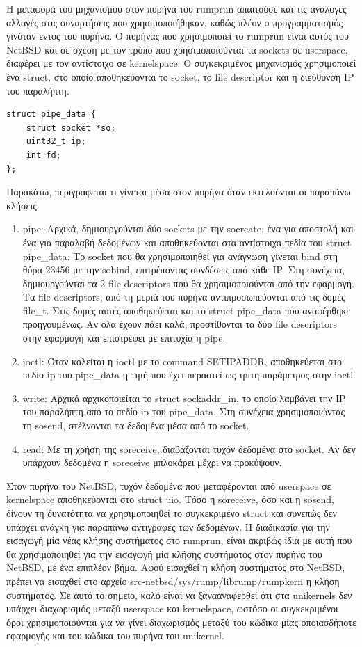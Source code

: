 Η μεταφορά του μηχανισμού στον πυρήνα του rumprun απαιτούσε και τις ανάλογες
αλλαγές στις συναρτήσεις που χρησιμοποιήθηκαν, καθώς πλέον ο προγραμματισμός
γινόταν εντός του πυρήνα. Ο πυρήνας που χρησιμοποιεί το rumprun είναι αυτός του
NetBSD και σε σχέση με τον τρόπο που χρησιμοποιούνται τα sockets σε userspace,
διαφέρει με τον αντίστοιχο σε kernelspace. Ο συγκεκριμένος μηχανισμός
χρησιμοποιεί ένα struct, στο οποίο αποθηκεύονται το socket, το file descriptor
και η διεύθυνση IP του παραλήπτη. 
\begin{lstlisting}[numbers=none,  xleftmargin=.2\textwidth, xrightmargin=.2\textwidth]
struct pipe_data {
	struct socket *so;
	uint32_t ip;
	int fd;
};
\end{lstlisting}
Παρακάτω, περιγράφεται τι γίνεται μέσα στον πυρήνα όταν εκτελούνται οι παραπάνω
κλήσεις. 
\begin{enumerate}
	\item pipe: Αρχικά, δημιουργούνται δύο sockets με την socreate, ένα για
		αποστολή και ένα για παραλαβή δεδομένων και αποθηκεύονται στα
		αντίστοιχα πεδία του struct pipe\_data. Το socket που θα
		χρησιμοποιηθεί για ανάγνωση γίνεται bind στη θύρα 23456 με την
		sobind,	επιτρέποντας συνδέσεις από κάθε IP. Στη συνέχεια,
		δημιουργούνται τα 2 file descriptors που θα χρησιμοποιούνται από
		την εφαρμογή. Τα file descriptors, από τη μεριά του πυρήνα
		αντιπροσωπεύονται από τις δομές file\_t. Στις δομές
		αυτές αποθηκεύεται και το struct pipe\_data που αναφέρθηκε
		προηγουμένως. Αν όλα έχουν πάει καλά, προστίθονται τα δύο file
		descriptors στην εφαρμογή και επιστρέφει με επιτυχία η pipe.
	\item ioctl: Όταν καλείται η ioctl με το command SETIPADDR, αποθηκεύεται
		στο πεδίο ip του pipe\_data η τιμή που έχει περαστεί ως τρίτη
		παράμετρος στην ioctl.
	\item write: Αρχικά αρχικοποιείται το struct sockaddr\_in, το οποίο
		λαμβάνει την IP του παραλήπτη από το πεδίο ip του pipe\_data.
		Στη συνέχεια χρησιμοποιώντας τη sosend, στέλνονται τα δεδομένα
		μέσα από το socket.
	\item read: Με τη χρήση της soreceive, διαβάζονται τυχόν δεδομένα στο
		socket. Αν δεν υπάρχουν δεδομένα η soreceive μπλοκάρει μέχρι να
		προκύψουν.
\end{enumerate}

Στον πυρήνα του NetBSD, τυχόν δεδομένα που μεταφέρονται από userspace σε
kernelspace αποθηκεύονται στο struct uio. Τόσο η soreceive, όσο και η sosend,
δίνουν τη δυνατότητα να χρησιμοποιηθεί το συγκεκριμένο struct και συνεπώς δεν
υπάρχει ανάγκη για παραπάνω αντιγραφές των δεδομένων. Η διαδικασία για την
εισαγωγή μία νέας κλήσης συστήματος στο rumprun, είναι ακριβώς ίδια με αυτή που
θα χρησιμοποιηθεί για την εισαγωγή μία κλήσης συστήματος στον πυρήνα του NetBSD,
με ένα επιπλέον βήμα. Αφού εισαχθεί η κλήση συστήματος στο NetBSD, πρέπει να
εισαχθεί στο αρχείο src-netbsd/sys/rump/librump/rumpkern η κλήση συστήματος.
Σε αυτό το σημείο, καλό είναι να ξανααναφερθεί ότι στα unikernels δεν υπάρχει
διαχωρισμός μεταξύ userspace και kernelspace, ωστόσο οι συγκεκριμένοι όροι
χρησιμοποιούνται για να γίνει διαχωρισμός μεταξύ του κώδικα μίας οποιασδήποτε
εφαρμογής και του κώδικα του πυρήνα του unikernel.

